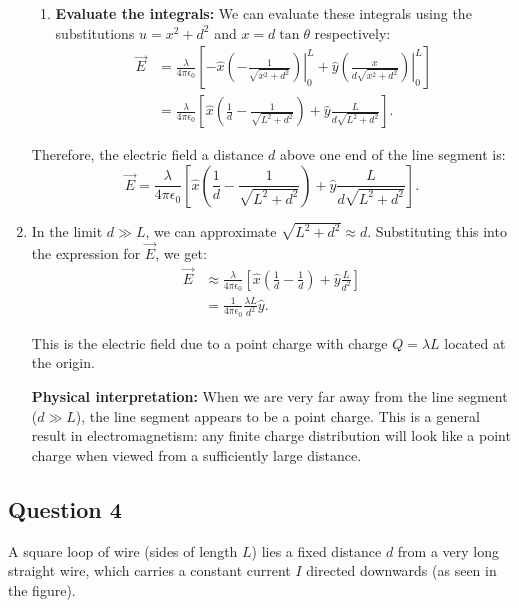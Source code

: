 \documentclass{article}
\begin{document}
\begin{enumerate}
\begin{enumerate}
\item \textbf{Evaluate the integrals:}  We can evaluate these integrals using the substitutions \(u = x^2 + d^2\) and \(x = d\tan\theta\) respectively:
    \begin{align*}
    \vec{E} &= \frac{\lambda}{4\pi\epsilon_0} \left[ -\hat{x} \left. \left( -\frac{1}{\sqrt{x^2 + d^2}} \right) \right|_0^L + \hat{y} \left. \left( \frac{x}{d\sqrt{x^2 + d^2}} \right) \right|_0^L \right] \\
    &= \frac{\lambda}{4\pi\epsilon_0} \left[ \hat{x} \left( \frac{1}{d} - \frac{1}{\sqrt{L^2 + d^2}} \right) + \hat{y} \frac{L}{d\sqrt{L^2 + d^2}} \right].
    \end{align*}

\end{enumerate}

Therefore, the electric field a distance \(d\) above one end of the line segment is:
\[\vec{E} = \frac{\lambda}{4\pi\epsilon_0} \left[ \hat{x} \left( \frac{1}{d} - \frac{1}{\sqrt{L^2 + d^2}} \right) + \hat{y} \frac{L}{d\sqrt{L^2 + d^2}} \right].\]


\item In the limit \(d \gg L\), we can approximate \(\sqrt{L^2 + d^2} \approx d\).  Substituting this into the expression for \(\vec{E}\), we get:
\begin{align*}
\vec{E} &\approx \frac{\lambda}{4\pi\epsilon_0} \left[ \hat{x} \left( \frac{1}{d} - \frac{1}{d} \right) + \hat{y} \frac{L}{d^2} \right] \\
&= \frac{1}{4\pi\epsilon_0} \frac{\lambda L}{d^2} \hat{y}.
\end{align*}

This is the electric field due to a point charge with charge \(Q = \lambda L\) located at the origin.  

\textbf{Physical interpretation:} When we are very far away from the line segment (\(d \gg L\)), the line segment appears to be a point charge. This is a general result in electromagnetism: any finite charge distribution will look like a point charge when viewed from a sufficiently large distance.
\end{enumerate}


\subsection{Question 4}
A square loop of wire (sides of length $L$) lies a fixed distance $d$ from a very long straight wire, which carries a constant current $I$ directed downwards (as seen in the figure).
\end{document}
